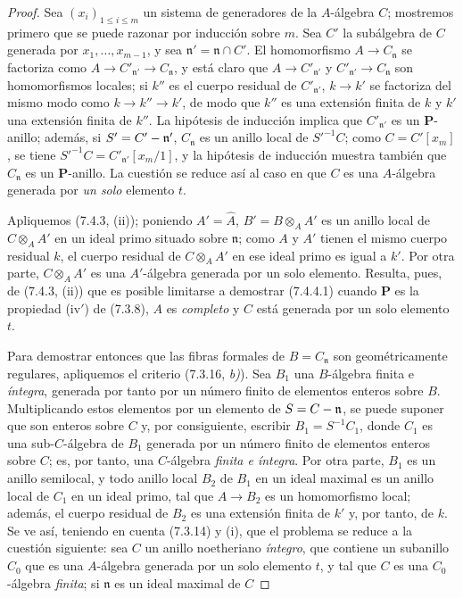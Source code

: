 \begin{proof}
Sea $(x_i)_{1\leqslant i\leqslant m}$ un sistema de generadores de la
$A$-álgebra $C$; mostremos primero que se puede razonar por inducción sobre
$m$. Sea $C'$ la subálgebra de $C$ generada por
$x_1,\ldots,x_{m-1}$, y sea $\mathfrak n'=\mathfrak n\cap C'$.
El homomorfismo $A\to C_{\mathfrak n}$ se factoriza como
$A\to C'_{\mathfrak n'}\to C_{\mathfrak n}$, y está claro que
$A\to C'_{\mathfrak n'}$ y $C'_{\mathfrak n'}\to C_{\mathfrak n}$ son
homomorfismos locales; si $k''$ es el cuerpo residual de
$C'_{\mathfrak n'}$, $k\to k'$ se factoriza del mismo modo como
$k\to k''\to k'$, de modo que $k''$ es una extensión finita de $k$ y $k'$
una extensión finita de $k''$. La hipótesis de inducción implica que
$C'_{\mathfrak n'}$ es un $\boldsymbol P$-anillo; además, si
$S'=C'-\mathfrak n'$, $C_{\mathfrak n}$ es un anillo local de
$S'^{-1}C$; como $C=C'[x_m]$, se tiene
$S'^{-1}C=C'_{\mathfrak n'}[x_m/1]$, y la hipótesis de inducción muestra
también que $C_{\mathfrak n}$ es un $\boldsymbol P$-anillo. La cuestión se reduce así al caso en que $C$ es una $A$-álgebra generada por
\emph{un solo} elemento $t$.

Apliquemos (7.4.3, (ii)); poniendo $A'=\widehat A$,
$B'=B\otimes_A A'$ es un anillo local de $C\otimes_A A'$ en un ideal
primo situado sobre $\mathfrak n$; como $A$ y $A'$ tienen el mismo cuerpo
residual $k$, el cuerpo residual de $C\otimes_A A'$ en ese ideal primo es
igual a $k'$. Por otra parte, $C\otimes_A A'$ es una $A'$-álgebra generada
por un solo elemento. Resulta, pues, de (7.4.3, (ii)) que es posible
limitarse a demostrar (7.4.4.1) cuando $\boldsymbol P$ es la propiedad
(iv$'$) de (7.3.8), $A$ es \emph{completo} y $C$ está generada por un solo
elemento $t$.

Para demostrar entonces que las fibras formales de $B=C_{\mathfrak n}$
son geométricamente regulares, apliquemos el criterio (7.3.16, \emph{b)}). Sea
$B_1$ una $B$-álgebra finita e \emph{íntegra}, generada por tanto por un
número finito de elementos enteros sobre $B$. Multiplicando estos
elementos por un elemento de $S=C-\mathfrak n$, se puede suponer que son
enteros sobre $C$ y, por consiguiente, escribir $B_1=S^{-1}C_1$, donde
$C_1$ es una sub-$C$-álgebra de $B_1$ generada por un número finito de
elementos enteros sobre $C$; es, por tanto, una $C$-álgebra
\emph{finita e íntegra}. Por otra parte, $B_1$ es un anillo semilocal, y
todo anillo local $B_2$ de $B_1$ en un ideal maximal es un anillo local
de $C_1$ en un ideal primo, tal que $A\to B_2$ es un homomorfismo local;
además, el cuerpo residual de $B_2$ es una extensión finita de $k'$ y,
por tanto, de $k$. Se ve así, teniendo en cuenta (7.3.14) y (i), que
el problema se reduce a la cuestión siguiente: sea $C$ un anillo noetheriano
\emph{íntegro}, que contiene un subanillo $C_0$ que es una $A$-álgebra
generada por un solo elemento $t$, y tal que $C$ es una $C_0$-álgebra
\emph{finita}; si $\mathfrak n$ es un ideal maximal de $C$


\end{proof}
